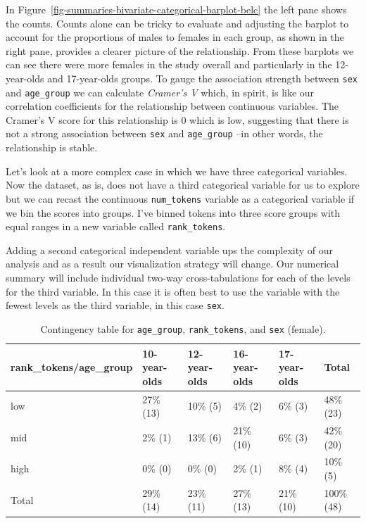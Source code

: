 \documentclass[
  letterpaper,
]{latex/krantz}
\begin{document}
In Figure~\ref{fig-summaries-bivariate-categorical-barplot-belc} the
left pane shows the counts. Counts alone can be tricky to evaluate and
adjusting the barplot to account for the proportions of males to females
in each group, as shown in the right pane, provides a clearer picture of
the relationship. From these barplots we can see there were more females
in the study overall and particularly in the 12-year-olds and
17-year-olds groups. To gauge the association strength between
\texttt{sex} and \texttt{age\_group} we can calculate \emph{Cramer's V}
which, in spirit, is like our correlation coefficients for the
relationship between continuous variables. The Cramer's V score for this
relationship is 0 which is low, suggesting that there is not a strong
association between \texttt{sex} and \texttt{age\_group} --in other
words, the relationship is stable.

Let's look at a more complex case in which we have three categorical
variables. Now the dataset, as is, does not have a third categorical
variable for us to explore but we can recast the continuous
\texttt{num\_tokens} variable as a categorical variable if we bin the
scores into groups. I've binned tokens into three score groups with
equal ranges in a new variable called \texttt{rank\_tokens}.

Adding a second categorical independent variable ups the complexity of
our analysis and as a result our visualization strategy will change. Our
numerical summary will include individual two-way cross-tabulations for
each of the levels for the third variable. In this case it is often best
to use the variable with the fewest levels as the third variable, in
this case \texttt{sex}.

\hypertarget{tbl-summaries-multivariate-categorical-table-belc-female}{}
\begin{table}
\caption{\label{tbl-summaries-multivariate-categorical-table-belc-female}Contingency table for \texttt{age\_group}, \texttt{rank\_tokens}, and
\texttt{sex} (female). }\tabularnewline

\centering
\begin{tabular}{llllll}
\toprule
rank\_tokens/age\_group & 10-year-olds & 12-year-olds & 16-year-olds & 17-year-olds & Total\\
\midrule
low & 27\% (13) & 10\%  (5) & 4\%  (2) & 6\%  (3) & 48\% (23)\\
mid & 2\%  (1) & 13\%  (6) & 21\% (10) & 6\%  (3) & 42\% (20)\\
high & 0\%  (0) & 0\%  (0) & 2\%  (1) & 8\%  (4) & 10\%  (5)\\
Total & 29\% (14) & 23\% (11) & 27\% (13) & 21\% (10) & 100\% (48)\\
\bottomrule
\end{tabular}
\end{table}
\end{document}
